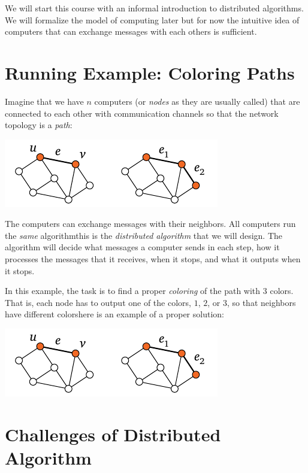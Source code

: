 

\noindent
We will start this course with an informal introduction to distributed algorithms. We will formalize the model of computing later but for now the intuitive idea of computers that can exchange messages with each others is sufficient.

\section{Running Example: Coloring Paths}

Imagine that we have $n$ computers (or \emph{nodes} as they are usually called) that are connected to each other with communication channels so that the network topology is a \emph{path}:
\begin{center}
    \includegraphics[page=\PIntroTopo]{figs.pdf}
\end{center}
The computers can exchange messages with their neighbors. All computers run the \emph{same} algorithm\mydash this is the \emph{distributed algorithm} that we will design. The algorithm will decide what messages a computer sends in each step, how it processes the messages that it receives, when it stops, and what it outputs when it stops.

In this example, the task is to find a proper \emph{coloring} of the path with $3$ colors. That is, each node has to output one of the colors, $1$, $2$, or $3$, so that neighbors have different colors\mydash here is an example of a proper solution:
\begin{center}
    \includegraphics[page=\PIntroCol]{figs.pdf}
\end{center}

\section{Challenges of Distributed Algorithm}\label{sec:intro-challenges}

